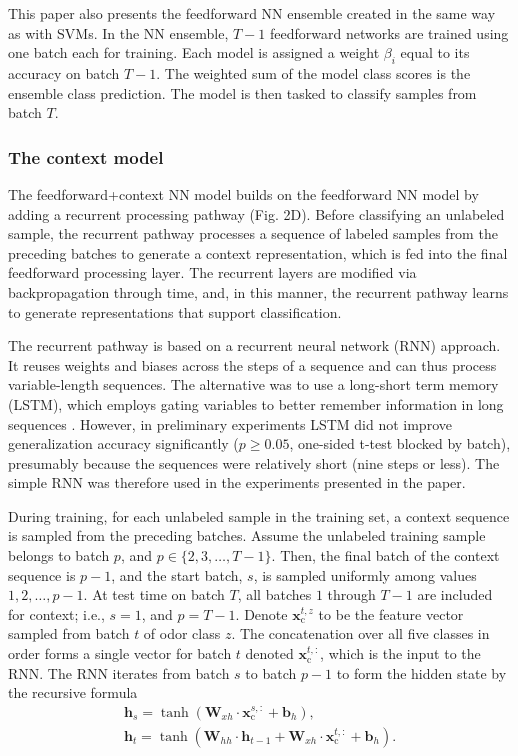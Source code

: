 \documentclass[onecolumn,pre,floats,aps,amsmath,amssymb,superscriptaddress]{revtex4-1}
\begin{document}
This paper also presents the feedforward NN ensemble created in the same way as with SVMs. In the NN ensemble, $T-1$ feedforward networks are trained using one batch each for training. Each model is assigned a weight $\beta_i$ equal to its accuracy on batch $T-1$. The weighted sum of the model class scores is the ensemble class prediction. The model is then tasked to classify samples from batch $T$.


\subsubsection{The context model}
The feedforward+context NN model builds on the feedforward NN model by adding a recurrent processing pathway (Fig. 2D). Before classifying an unlabeled sample, the recurrent pathway processes a sequence of labeled samples from the preceding batches to generate a context representation, which is fed into the final feedforward processing layer. The recurrent layers are modified via backpropagation through time, and, in this manner, the recurrent pathway learns to generate representations that support classification.

The recurrent pathway is based on a recurrent neural network (RNN) approach. It reuses weights and biases across the steps of a sequence and can thus process variable-length sequences. The alternative was to use a long-short term memory (LSTM), which employs gating variables to better remember information in long sequences \cite{hochreiter_long_1997}. However, in preliminary experiments LSTM did not improve generalization accuracy significantly ($p\geq 0.05$, one-sided t-test blocked by batch), presumably because the sequences were relatively short (nine steps or less). The simple RNN was therefore used in the experiments presented in the paper. 

During training, for each unlabeled sample in the training set, a context sequence is sampled from the preceding batches. Assume the unlabeled training sample belongs to batch $p$, and $p \in \{ 2, 3, \ldots, T-1 \}$. Then, the final batch of the context sequence is $p-1$, and the start batch, $s$, is sampled uniformly among values $1, 2, \ldots, p-1$. At test time on batch $T$, all batches $1$ through $T-1$ are included for context; i.e., $s=1$, and $p=T-1$. Denote $\mathbf{x}_\mathrm{c}^{t,z}$ to be the feature vector sampled from batch $t$ of odor class $z$. The concatenation over all five classes in order forms a single vector for batch $t$ denoted $\mathbf{x}_\mathrm{c}^{t,:}$, which is the input to the RNN. The RNN iterates from batch $s$ to batch $p-1$ to form the hidden state by the recursive formula
\begin{equation}
\begin{split}
\mathbf{h}_s = \tanh(\mathbf{W}_{xh} \cdot \mathbf{x}_\mathrm{c}^{s,:} + \mathbf{b}_h),\\
\mathbf{h}_t = \tanh(\mathbf{W}_{hh}\cdot \mathbf{h}_{t-1} + \mathbf{W}_{xh} \cdot \mathbf{x}_\mathrm{c}^{t,:} +  \mathbf{b}_h).
\end{split}
\end{equation}
\end{document}
